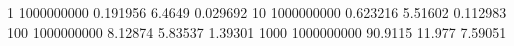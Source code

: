 1 1000000000 0.191956 6.4649 0.029692
10 1000000000 0.623216 5.51602 0.112983
100 1000000000 8.12874 5.83537 1.39301
1000 1000000000 90.9115 11.977 7.59051
